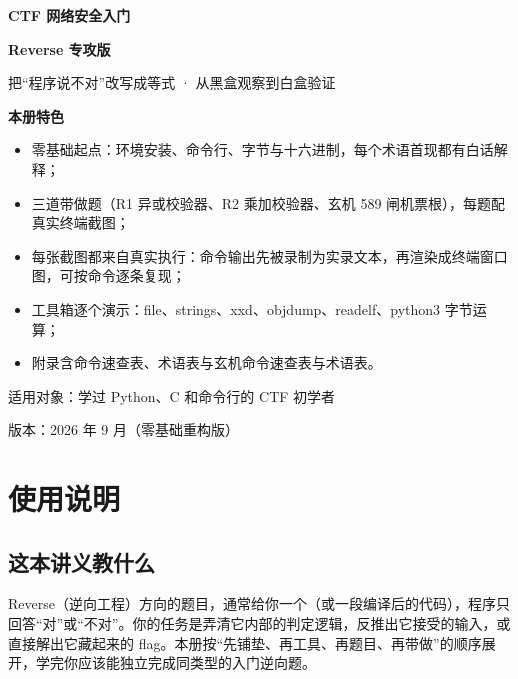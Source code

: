 \documentclass[UTF8,12pt,oneside]{ctexbook}
\begin{document}
\frontmatter
\begin{titlepage}
\centering
\vspace*{28mm}
{\Huge\bfseries CTF 网络安全入门\par}
\vspace{6mm}
{\LARGE\bfseries Reverse 专攻版\par}
\vspace{8mm}
{\large 把“程序说不对”改写成等式 · 从黑盒观察到白盒验证\par}
\vspace{10mm}
{\large\bfseries 本册特色\par}
\vspace{3mm}
\begin{minipage}{0.86\linewidth}
\begin{itemize}
\item 零基础起点：环境安装、命令行、字节与十六进制，每个术语首现都有白话解释；
\item 三道带做题（R1 异或校验器、R2 乘加校验器、玄机 589 闸机票根），每题配真实终端截图；
\item 每张截图都来自真实执行：命令输出先被录制为实录文本，再渲染成终端窗口图，可按命令逐条复现；
\item 工具箱逐个演示：file、strings、xxd、objdump、readelf、python3 字节运算；
\item 附录含命令速查表、术语表与玄机命令速查表与术语表。
\end{itemize}
\end{minipage}
\vfill
{\large 适用对象：学过 Python、C 和命令行的 CTF 初学者\par}
\vspace{4mm}
{\large 版本：2026 年 9 月（零基础重构版）\par}
\end{titlepage}

\chapter*{使用说明}

\section*{这本讲义教什么}
Reverse（逆向工程）方向的题目，通常给你一个（或一段编译后的代码），程序只回答“对”或“不对”。你的任务是弄清它内部的判定逻辑，反推出它接受的输入，或直接解出它藏起来的 flag。本册按“先铺垫、再工具、再题目、再带做”的顺序展开，学完你应该能独立完成同类型的入门逆向题。
\end{document}
